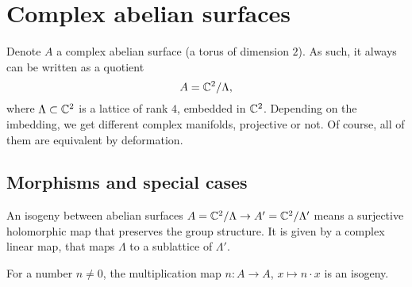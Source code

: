 \section{Complex abelian surfaces}
Denote $A$ a complex abelian surface (a torus of dimension $2$). As such, it always can be written as a quotient
$$
A = \mathbb{C}^2/\Lambda,
$$
where $\Lambda\subset \mathbb{C}^2$ is a lattice of rank $4$, embedded in $\mathbb{C}^2$. 
Depending on the imbedding, we get different complex manifolds, projective or not. Of course, all of them are equivalent by deformation.
\subsection{Morphisms and special cases}
\begin{definition}
An isogeny between abelian surfaces $A=\mathbb{C}^2/\Lambda\rightarrow A'=\mathbb{C}^2/\Lambda'$ means a surjective holomorphic map that preserves the group structure. It is given by a complex linear map, that maps $\Lambda$ to a sublattice of $\Lambda'$. 
\end{definition}
\begin{example}
For a number $n\neq 0$, the multiplication map $n: A\rightarrow A$, $x\mapsto n\cdot x$ is an isogeny.
\end{example}


